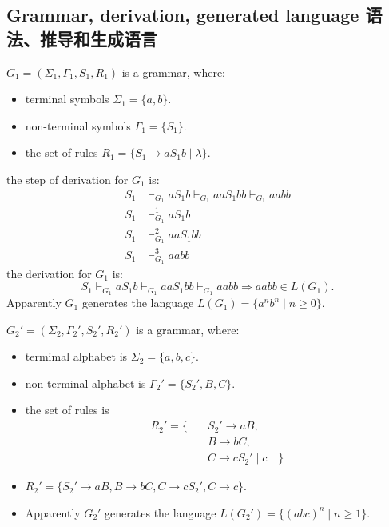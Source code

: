 \documentclass[a4paper,11pt,utf8]{article}
\begin{document}
\subsection{Grammar, derivation, generated language 语法、推导和生成语言}
\begin{tcolorbox}[title=example 1,colback=white,colframe=black,width=\textwidth,arc=0pt]
    $G_1 = (\Sigma_1, \Gamma_1, S_1, R_1)$ is a grammar, where:
    \begin{itemize}
        \item terminal symbols $\Sigma_1 = \{a,b\}$.
        \item non-terminal symbols $\Gamma_1 = \{S_1\}$.
        \item the set of rules $R_1 = \{S_1 \to a S_1 b \mid \lambda\}$.
    \end{itemize}
    \lineindent the step of derivation for $G_1$ is:
    \[
        \begin{aligned}
            S_1 &\vdash_{G_1} a S_1 b \vdash_{G_1} a a S_1 b b \vdash_{G_1} aabb \\[1ex]
            S_1 &\vdash_{G_1}^1 a S_1 b \\[1ex]
            S_1 &\vdash_{G_1}^2 aa S_1 bb \\[1ex]
            S_1 &\vdash_{G_1}^3 aabb
        \end{aligned}
    \]
    \lineindent the derivation for $G_1$ is:
    \[
        S_1 \vdash_{G_1} a S_1 b \vdash_{G_1} aa S_1 bb \vdash_{G_1} aabb \Rightarrow aabb \in L(G_1).
    \]
    Apparently $G_1$ generates the language $L(G_1) = \{a^nb^n \mid n \geq 0\}$.
\end{tcolorbox}
\begin{tcolorbox}[title=example 2,colback=white,colframe=black,width=\textwidth,arc=0pt]
    $G_2' = (\Sigma_2, \Gamma_2', S_2', R_2')$ is a grammar, where:
    \begin{itemize}
        \item termimal alphabet is $\Sigma_2 = \{a,b,c\}$.
        \item non-terminal alphabet is $\Gamma_2' = \{S_2', B,C\}$.
        \item the set of rules is \[
            \begin{aligned}
                R_2' = \{ \quad & S_2' \to aB, \\[1ex]
                & B \to bC, \\[1ex]
                & C \to c S_2' \mid c \quad \}
            \end{aligned}
        \]
        \item $R_2' = \{S_2' \to aB, B \to bC, C \to cS_2', C \to c\}$.
        \item Apparently $G_2'$ generates the language $L(G_2') = \{(abc)^n \mid n \geq 1\}$.
    \end{itemize}
\end{tcolorbox}
\end{document}
